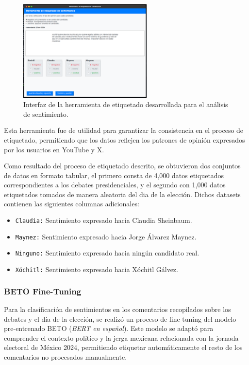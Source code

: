 \documentclass[10pt, a4paper]{article}
\begin{document}
	\begin{figure}[H]
		\centering
		\includegraphics[width=0.6\textwidth]{etiquetado.png}
		\caption{Interfaz de la herramienta de etiquetado desarrollada para el análisis de sentimiento.}
		\label{fig:etiquetado}
	\end{figure}
	
	Esta herramienta fue de utilidad para garantizar la consistencia en el proceso de etiquetado, permitiendo que los datos reflejen los patrones de opinión expresados por los usuarios en YouTube y X.
	
	Como resultado del proceso de etiquetado descrito, se obtuvieron dos conjuntos de datos en formato tabular, el primero consta de 4,000 datos etiquetados correspondientes a los debates presidenciales, y el segundo con 1,000 datos etiquetados tomados de manera aleatoria del dia de la elección. Dichos datasets contienen las siguientes columnas adicionales:
	
	\begin{itemize}
		\item \texttt{Claudia:} Sentimiento expresado hacia Claudia Sheinbaum.
		\item \texttt{Maynez:} Sentimiento expresado hacia Jorge Álvarez Maynez.
		\item \texttt{Ninguno:} Sentimiento expresado hacia ningún candidato real.
		\item \texttt{Xóchitl:} Sentimiento expresado hacia Xóchitl Gálvez.
	\end{itemize}
	
	
	
	\subsubsection{BETO Fine-Tuning}
	
	Para la clasificación de sentimientos en los comentarios recopilados sobre los debates y el día de la elección, se realizó un proceso de fine-tuning del modelo pre-entrenado BETO (\textit{BERT en español}). Este modelo se adaptó para comprender el contexto político y la jerga mexicana relacionada con la jornada electoral de México 2024, permitiendo etiquetar automáticamente el resto de los comentarios no procesados manualmente.
	
\end{document}

